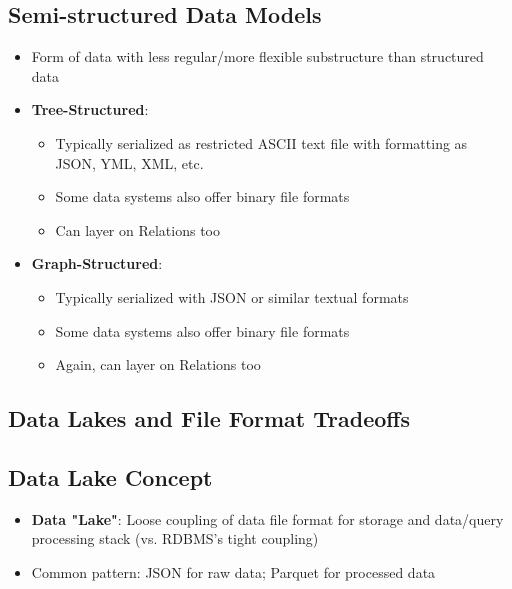\documentclass[12pt]{article}
\begin{document}
\subsection{Semi-structured Data Models}

\begin{itemize}
    \item Form of data with less regular/more flexible substructure than structured data
    \item \textbf{Tree-Structured}:
    \begin{itemize}
        \item Typically serialized as restricted ASCII text file with formatting as JSON, YML, XML, etc.
        \item Some data systems also offer binary file formats
        \item Can layer on Relations too
    \end{itemize}
    \item \textbf{Graph-Structured}:
    \begin{itemize}
        \item Typically serialized with JSON or similar textual formats
        \item Some data systems also offer binary file formats
        \item Again, can layer on Relations too
    \end{itemize}
\end{itemize}

\subsection{Data Lakes and File Format Tradeoffs}

\subsection{Data Lake Concept}
\begin{itemize}
    \item \textbf{Data "Lake"}: Loose coupling of data file format for storage and data/query processing stack (vs. RDBMS's tight coupling)
    \item Common pattern: JSON for raw data; Parquet for processed data
\end{itemize}
\end{document}
